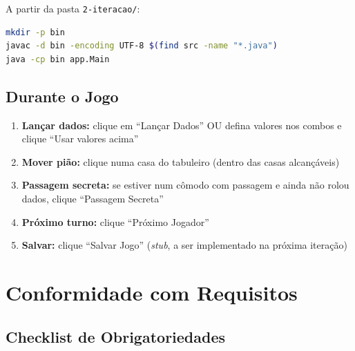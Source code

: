 \documentclass[12pt,a4paper]{report}
\begin{document}
A partir da pasta \texttt{2-iteracao/}:

\begin{lstlisting}[language=bash]
mkdir -p bin
javac -d bin -encoding UTF-8 $(find src -name "*.java")
java -cp bin app.Main
\end{lstlisting}

\section{Durante o Jogo}

\begin{enumerate}
    \item \textbf{Lançar dados:} clique em ``Lançar Dados'' OU defina valores nos combos e clique ``Usar valores acima''
    \item \textbf{Mover pião:} clique numa casa do tabuleiro (dentro das casas alcançáveis)
    \item \textbf{Passagem secreta:} se estiver num cômodo com passagem e ainda não rolou dados, clique ``Passagem Secreta''
    \item \textbf{Próximo turno:} clique ``Próximo Jogador''
    \item \textbf{Salvar:} clique ``Salvar Jogo'' (\textit{stub}, a ser implementado na próxima iteração)
\end{enumerate}

\chapter{Conformidade com Requisitos}

\section{Checklist de Obrigatoriedades}
\end{document}
